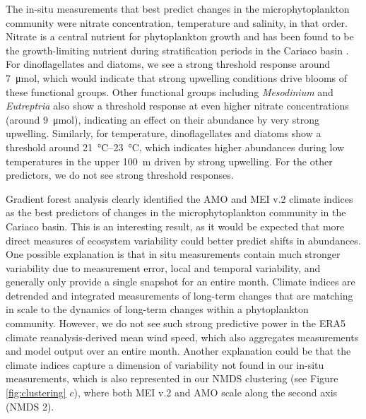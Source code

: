 \documentclass[draft]{agujournal2019}
\begin{document}
The in-situ measurements that best predict changes in the microphytoplankton community were nitrate concentration, temperature and salinity, in that order. Nitrate is a central nutrient for phytoplankton growth and has been found to be the growth-limiting nutrient during stratification periods in the Cariaco basin \cite{muller-karger_scientific_2019}. For dinoflagellates and diatoms, we see a strong threshold response around \qty{7}{\micro \mole}, which would indicate that strong upwelling conditions drive blooms of these functional groups. Other functional groups including \textit{Mesodinium} and \textit{Eutreptria} also show a threshold response at even higher nitrate concentrations (around \qty{9}{\micro \mole}), indicating an effect on their abundance by very strong upwelling. Similarly, for temperature, dinoflagellates and diatoms show a threshold around \qtyrange{21}{23}{\celsius}, which indicates higher abundances during low temperatures in the upper \qty{100}{m} driven by strong upwelling. For the other predictors, we do not see strong threshold responses.

Gradient forest analysis clearly identified the AMO and MEI v.2 climate indices as the best predictors of changes in the microphytoplankton community in the Cariaco basin. This is an interesting result, as it would be expected that more direct measures of ecosystem variability could better predict shifts in abundances. One possible explanation is that in situ measurements contain much stronger variability due to measurement error, local and temporal variability, and generally only provide a single snapshot for an entire month. Climate indices are detrended and integrated measurements of long-term changes that are matching in scale to the dynamics of long-term changes within a phytoplankton community. However, we do not see such strong predictive power in the ERA5 climate reanalysis-derived mean wind speed, which also aggregates measurements and model output over an entire month. 
Another explanation could be that the climate indices capture a dimension of variability not found in our in-situ measurements, which is also represented in our NMDS clustering (see Figure \ref{fig:clustering} $c$), where both MEI v.2 and AMO scale along the second axis (NMDS 2). %

\end{document}
